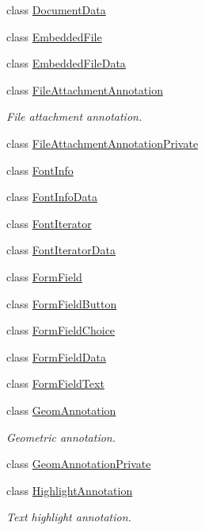 \begin{DoxyCompactItemize}
class \hyperlink{class_poppler_1_1_document_data}{Document\+Data}
\item 
class \hyperlink{class_poppler_1_1_embedded_file}{Embedded\+File}
\item 
class \hyperlink{class_poppler_1_1_embedded_file_data}{Embedded\+File\+Data}
\item 
class \hyperlink{class_poppler_1_1_file_attachment_annotation}{File\+Attachment\+Annotation}
\begin{DoxyCompactList}\small\item\em File attachment annotation. \end{DoxyCompactList}\item 
class \hyperlink{class_poppler_1_1_file_attachment_annotation_private}{File\+Attachment\+Annotation\+Private}
\item 
class \hyperlink{class_poppler_1_1_font_info}{Font\+Info}
\item 
class \hyperlink{class_poppler_1_1_font_info_data}{Font\+Info\+Data}
\item 
class \hyperlink{class_poppler_1_1_font_iterator}{Font\+Iterator}
\item 
class \hyperlink{class_poppler_1_1_font_iterator_data}{Font\+Iterator\+Data}
\item 
class \hyperlink{class_poppler_1_1_form_field}{Form\+Field}
\item 
class \hyperlink{class_poppler_1_1_form_field_button}{Form\+Field\+Button}
\item 
class \hyperlink{class_poppler_1_1_form_field_choice}{Form\+Field\+Choice}
\item 
class \hyperlink{class_poppler_1_1_form_field_data}{Form\+Field\+Data}
\item 
class \hyperlink{class_poppler_1_1_form_field_text}{Form\+Field\+Text}
\item 
class \hyperlink{class_poppler_1_1_geom_annotation}{Geom\+Annotation}
\begin{DoxyCompactList}\small\item\em Geometric annotation. \end{DoxyCompactList}\item 
class \hyperlink{class_poppler_1_1_geom_annotation_private}{Geom\+Annotation\+Private}
\item 
class \hyperlink{class_poppler_1_1_highlight_annotation}{Highlight\+Annotation}
\begin{DoxyCompactList}\small\item\em Text highlight annotation. \end{DoxyCompactList}\item 

\end{DoxyCompactItemize}

